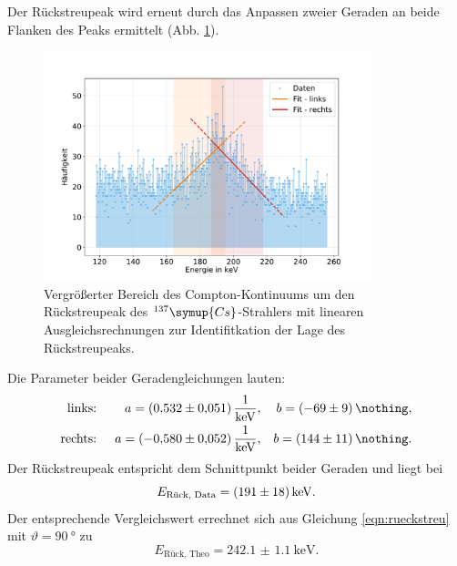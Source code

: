 Der Rückstreupeak wird erneut durch das Anpassen zweier Geraden an beide Flanken des Peaks ermittelt (Abb. \ref{fig:cs_rueck}).
\begin{figure}[h!]
  \centering
  \includegraphics[width=0.85\textwidth]{content/images/caesium_rueckstreupeak.pdf}
  \caption{Vergrößerter Bereich des Compton-Kontinuums um den Rückstreupeak des $^{137}\symup{Cs}$-Strahlers mit linearen Ausgleichsrechnungen zur Identifitkation der Lage des Rückstreupeaks.}
  \label{fig:cs_rueck}
\end{figure}
Die Parameter beider Geradengleichungen lauten:
\begin{align*}
	\text{links: }  && a = \SI{0.532 (51) }{\frac{1}{\kilo \electronvolt}},  && b = \SI{-69 (9) }{\nothing}, \\
	\text{rechts: } && a = \SI{-0.580 (52) }{\frac{1}{\kilo \electronvolt}}, && b = \SI{144 (11) }{\nothing}. \\
\end{align*}
Der Rückstreupeak entspricht dem Schnittpunkt beider Geraden und liegt bei
\begin{equation*}
	E_{\text{Rück, Data}} = \SI{191 (18)}{\kilo \electronvolt}.
\end{equation*}
Der entsprechende Vergleichswert errechnet sich aus Gleichung \eqref{eqn:rueckstreu} mit $\vartheta = \SI{90}{°}$ zu
\begin{equation*}
	E_{\text{Rück, Theo}} = \SI{242.1(11)}{\kilo \electronvolt}.
\end{equation*}
\FloatBarrier

